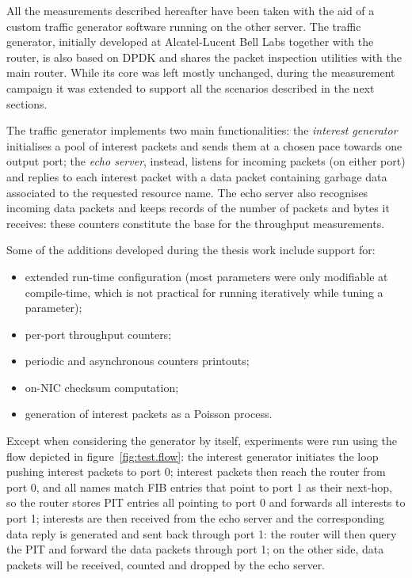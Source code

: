 \documentclass[11pt,a4paper,twoside,titlepage,openany]{book}
\begin{document}
All the measurements described hereafter have been taken with the aid of a custom traffic generator software running on the other server. The traffic generator, initially developed at Alcatel-Lucent Bell Labs together with the router, is also based on DPDK and shares the packet inspection utilities with the main router. While its core was left mostly unchanged, during the measurement campaign it was extended to support all the scenarios described in the next sections.

The traffic generator implements two main functionalities: the \emph{interest generator} initialises a pool of interest packets and sends them at a chosen pace towards one output port; the \emph{echo server}, instead, listens for incoming packets (on either port) and replies to each interest packet with a data packet containing garbage data associated to the requested resource name. The echo server also recognises incoming data packets and keeps records of the number of packets and bytes it receives: these counters constitute the base for the throughput measurements.

Some of the additions developed during the thesis work include support for:
\begin{itemize}[noitemsep,nolistsep]
  \item extended run-time configuration (most parameters were only modifiable at compile-time, which is not practical for running iteratively while tuning a parameter);
  \item per-port throughput counters;
  \item periodic and asynchronous counters printouts;
  \item on-NIC checksum computation;
  \item generation of interest packets as a Poisson process.
\end{itemize}

Except when considering the generator by itself, experiments were run using the flow depicted in figure~\ref{fig:test.flow}: the interest generator initiates the loop pushing interest packets to port 0; interest packets then reach the router from port 0, and all names match \gls{FIB} entries that point to port 1 as their next-hop, so the router stores \gls{PIT} entries all pointing to port 0 and forwards all interests to port 1; interests are then received from the echo server and the corresponding data reply is generated and sent back through port 1: the router will then query the \gls{PIT} and forward the data packets through port 1; on the other side, data packets will be received, counted and dropped by the echo server.
 
\end{document}
